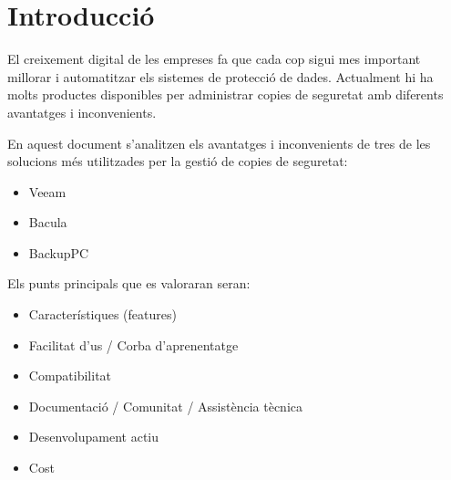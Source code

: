 




\section{Introducció}%
\label{sec:intro}

El creixement digital de les empreses fa que cada cop sigui mes important
millorar i automatitzar els sistemes de protecció de dades. Actualment hi ha
molts productes disponibles per administrar copies de seguretat amb diferents
avantatges i inconvenients.

En aquest document s'analitzen els avantatges i inconvenients de tres de les
solucions més utilitzades per la gestió de copies de seguretat:

\begin{itemize}
    \item Veeam
    \item Bacula
    \item BackupPC
\end{itemize}

Els punts principals que es valoraran seran:

\begin{itemize}
    \item Característiques (\textenglish{features})
    \item Facilitat d'us / Corba d'aprenentatge
    \item Compatibilitat
    \item Documentació / Comunitat / Assistència tècnica
    \item Desenvolupament actiu
    \item Cost
\end{itemize}

